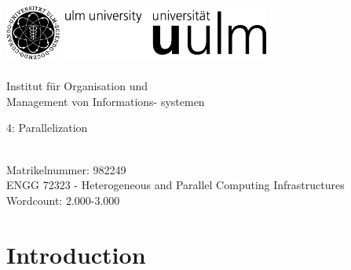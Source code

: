 \documentclass[BCOR20mm,DIV14,10pt,headinclude,footexclude,bibtotoc,liststotoc]{article}
\author{Jonas Otto} \let\theauthor\@author
\newcommand\matrikelnr{982249}
\newcommand\topicNrTitle{4: Parallelization}
\newcommand\theWordCount{2.000-3.000}
\begin{document}
\begin{titlepage}

	\includegraphics[height=1.8cm]{images/logo_100_sw_bildmarke}
	\hfill
	\includegraphics[height=1.8cm]{images/logo_100_sw_wortmarke}\\[1em]


	{\footnotesize
	\\
	\hspace*{8.25cm}Institut f{\"u}r Organisation und\\
	\hspace*{8.25cm}Management von Informations-
	\hspace*{8.25cm}systemen\\[1em]
	}

	\vspace{10em}
	\begin{center}
		\begin{Large}
			\topicNrTitle \\
		\end{Large}
		\vspace{15em}
		\theauthor \\
		Matrikelnummer: \matrikelnr \\
		ENGG 72323 - Heterogeneous and Parallel Computing Infrastructures \\
		Wordcount: \theWordCount
	\end{center}

\end{titlepage}

\section{Introduction}
\end{document}
